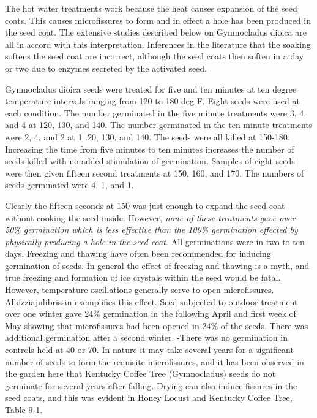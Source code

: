 The hot water treatments work because the heat causes expansion of the seed
coats. This causes microfissures to form and in effect a hole has been produced in the
seed coat. The extensive studies described below on Gymnocladus dioica are all in
accord with this interpretation. Inferences in the literature that the soaking softens the
seed coat are incorrect, although the seed coats then soften in a day or two due to
enzymes secreted by the activated seed.

Gymnocladus dioica seeds were treated for five and ten minutes at ten degree
temperature intervals ranging from 120 to 180 deg F. Eight seeds were used at each
condition. The number germinated in the five minute treatments were 3, 4, and 4 at
120, 130, and 140. The number germinated in the ten minute treatments were 2, 4,
and 2 at 1 .20, 130, and 140. The seeds were all killed at 150-180. Increasing the time
from five minutes to ten minutes increases the number of seeds killed with no added
stimulation of germination. Samples of eight seeds were then given fifteen second
treatments at 150, 160, and 170. The numbers of seeds germinated were 4, 1, and 1.

Clearly the fifteen seconds at 150 was just enough to expand the seed coat without
cooking the seed inside. However, \textit{none of these treatments gave over 50\%
germination which is less effective than the 100\% germination effected by physically
producing a hole in the seed coat.} All germinations were in two to ten days.
Freezing and thawing have often been recommended for inducing germination
of seeds. In general the effect of freezing and thawing is a myth, and true freezing and
formation of ice crystals within the seed would be fatal. However, temperature
oscillations generally serve to open microfissures. Albizziajulibrissin exemplifies this
effect. Seed subjected to outdoor treatment over one winter gave 24\% germination in
the following April and first week of May showing that microfissures had been opened
in 24\% of the seeds. There was additional germination after a second winter. -There
was no germination in controls held at 40 or 70. In nature it may take several years for
a significant number of seeds to form the requisite microfissures, and it has been
observed in the garden here that Kentucky Coffee Tree (Gymnocladus) seeds do not
germinate for several years after falling. Drying can also induce fissures in the seed
coats, and this was evident in Honey Locust and Kentucky Coffee Tree, Table 9-1.

